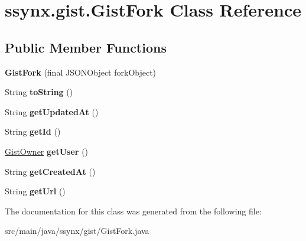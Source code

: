 \hypertarget{classssynx_1_1gist_1_1GistFork}{}\section{ssynx.\+gist.\+Gist\+Fork Class Reference}
\label{classssynx_1_1gist_1_1GistFork}
\subsection*{Public Member Functions}
\begin{DoxyCompactItemize}
\item 
\mbox{\label{classssynx_1_1gist_1_1GistFork_a9fbdd64dbe3d88ea97b4df4f315e5266}} 
{\bfseries Gist\+Fork} (final J\+S\+O\+N\+Object fork\+Object)
\item 
\mbox{\label{classssynx_1_1gist_1_1GistFork_a60f3f98b4ea21a95addbd532d9dd3006}} 
String {\bfseries to\+String} ()
\item 
\mbox{\label{classssynx_1_1gist_1_1GistFork_a9336517a3f7dfc7ea23c059336527a97}} 
String {\bfseries get\+Updated\+At} ()
\item 
\mbox{\label{classssynx_1_1gist_1_1GistFork_a921de97e883f2a7a6dfc29a410d7aa89}} 
String {\bfseries get\+Id} ()
\item 
\mbox{\label{classssynx_1_1gist_1_1GistFork_af398d1cf07dd690985f6e423a1ee947c}} 
\hyperlink{classssynx_1_1gist_1_1GistOwner}{Gist\+Owner} {\bfseries get\+User} ()
\item 
\mbox{\label{classssynx_1_1gist_1_1GistFork_a28cdffb7e5af7e32ae953327b9b605ae}} 
String {\bfseries get\+Created\+At} ()
\item 
\mbox{\label{classssynx_1_1gist_1_1GistFork_af44ea21fd3d6e14201816f6d4647e272}} 
String {\bfseries get\+Url} ()
\end{DoxyCompactItemize}


The documentation for this class was generated from the following file\+:\begin{DoxyCompactItemize}
\item 
src/main/java/ssynx/gist/Gist\+Fork.\+java\end{DoxyCompactItemize}
